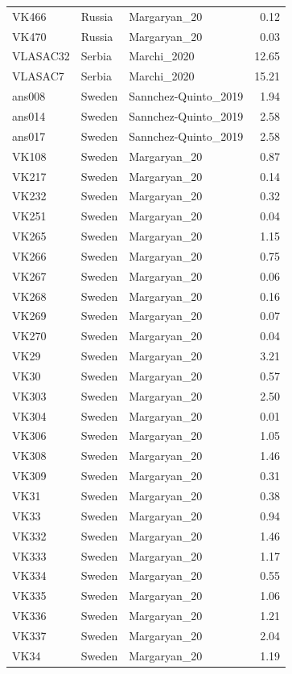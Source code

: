 \begin{longtable}[t]{lllr}
VK466 & Russia & Margaryan\_20 & 0.12\\
VK470 & Russia & Margaryan\_20 & 0.03\\
VLASAC32 & Serbia & Marchi\_2020 & 12.65\\
VLASAC7 & Serbia & Marchi\_2020 & 15.21\\
ans008 & Sweden & Sannchez-Quinto\_2019 & 1.94\\
ans014 & Sweden & Sannchez-Quinto\_2019 & 2.58\\
ans017 & Sweden & Sannchez-Quinto\_2019 & 2.58\\
VK108 & Sweden & Margaryan\_20 & 0.87\\
VK217 & Sweden & Margaryan\_20 & 0.14\\
VK232 & Sweden & Margaryan\_20 & 0.32\\
VK251 & Sweden & Margaryan\_20 & 0.04\\
VK265 & Sweden & Margaryan\_20 & 1.15\\
VK266 & Sweden & Margaryan\_20 & 0.75\\
VK267 & Sweden & Margaryan\_20 & 0.06\\
VK268 & Sweden & Margaryan\_20 & 0.16\\
VK269 & Sweden & Margaryan\_20 & 0.07\\
VK270 & Sweden & Margaryan\_20 & 0.04\\
VK29 & Sweden & Margaryan\_20 & 3.21\\
VK30 & Sweden & Margaryan\_20 & 0.57\\
VK303 & Sweden & Margaryan\_20 & 2.50\\
VK304 & Sweden & Margaryan\_20 & 0.01\\
VK306 & Sweden & Margaryan\_20 & 1.05\\
VK308 & Sweden & Margaryan\_20 & 1.46\\
VK309 & Sweden & Margaryan\_20 & 0.31\\
VK31 & Sweden & Margaryan\_20 & 0.38\\
VK33 & Sweden & Margaryan\_20 & 0.94\\
VK332 & Sweden & Margaryan\_20 & 1.46\\
VK333 & Sweden & Margaryan\_20 & 1.17\\
VK334 & Sweden & Margaryan\_20 & 0.55\\
VK335 & Sweden & Margaryan\_20 & 1.06\\
VK336 & Sweden & Margaryan\_20 & 1.21\\
VK337 & Sweden & Margaryan\_20 & 2.04\\
VK34 & Sweden & Margaryan\_20 & 1.19\\

\end{longtable}

